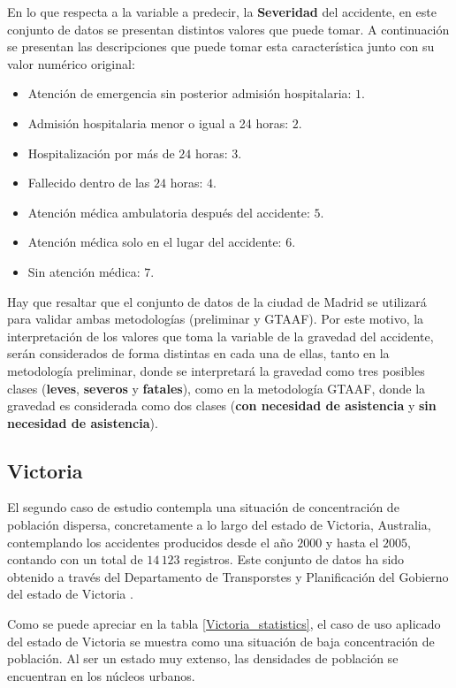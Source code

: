\documentclass{uathesis-es}
\begin{document}
{En lo que respecta a la variable a predecir, la \textbf{Severidad} del accidente, en este conjunto de datos se presentan distintos valores que puede tomar. A continuación se presentan las descripciones que puede tomar esta característica junto con su valor numérico original:

\begin{itemize}
    \item Atención de emergencia sin posterior admisión hospitalaria: $1$.
    \item Admisión hospitalaria menor o igual a 24 horas: $2$.
    \item Hospitalización por más de $24$ horas: $3$.
    \item Fallecido dentro de las $24$ horas: $4$.
    \item Atención médica ambulatoria después del accidente: $5$.
    \item Atención médica solo en el lugar del accidente: $6$.
    \item Sin atención médica: $7$.
\end{itemize}

Hay que resaltar que el conjunto de datos de la ciudad de Madrid se utilizará para validar ambas metodologías (preliminar y GTAAF). Por este motivo, la interpretación de los valores que toma la variable de la gravedad del accidente, serán considerados de forma distintas en cada una de ellas, tanto en la metodología preliminar, donde se interpretará la gravedad como tres posibles clases (\textbf{leves}, \textbf{severos} y \textbf{fatales}), como en la metodología GTAAF, donde la gravedad es considerada como dos clases (\textbf{con necesidad de asistencia} y \textbf{sin necesidad de asistencia}).


\subsection*{Victoria}

El segundo caso de estudio contempla una situación de concentración de población dispersa, concretamente a lo largo del estado de Victoria, Australia, contemplando los accidentes producidos desde el año $2000$ y hasta el $2005$, contando con un total de $14\,123$ registros. Este conjunto de datos ha sido obtenido a través del Departamento de Transporstes y Planificación del Gobierno del estado de Victoria \cite{InfoDatasetVictoria}.

Como se puede apreciar en la tabla \ref{Victoria_statistics}, el caso de uso aplicado del estado de Victoria se muestra como una situación de baja concentración de población. Al ser un estado muy extenso, las densidades de población se encuentran en los núcleos urbanos.

}
\end{document}
